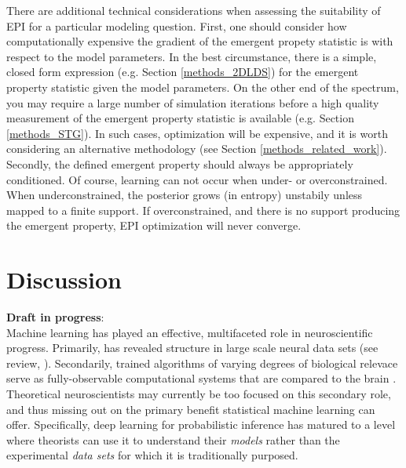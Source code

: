 \documentclass[11pt]{article}
\begin{document}
There are additional technical considerations when assessing the suitability of EPI for a particular modeling question.  
First, one should consider how computationally expensive the gradient of the emergent propety statistic is with respect to the model parameters. 
In the best circumstance, there is a simple, closed form expression (e.g. Section \ref{methods_2DLDS}) for the emergent property statistic given the model parameters.  
On the other end of the spectrum, you may require a large number of simulation iterations before a high quality measurement of the emergent property statistic is available  (e.g. Section \ref{methods_STG}).  In such cases, optimization will be expensive, and it is worth considering an alternative methodology (see Section \ref{methods_related_work}).   Secondly, the defined emergent property should always be appropriately conditioned.  
Of course, learning can not occur when under- or overconstrained.  
When underconstrained, the posterior grows (in entropy) unstabily unless mapped to a finite support.  
If overconstrained, and there is no support producing the emergent property, EPI optimization will never converge.

\section{Discussion}
\textbf{Draft in progress}: \\ 
Machine learning has played an effective, multifaceted role in neuroscientific progress. 
Primarily, has revealed structure in large scale neural data sets \cite{kass2001spike, brown1998statistical, paninski2004maximum, byron2009gaussian, latimer2015single, duncker2019learning} (see review, \cite{paninski2018neural}).  
Secondarily, trained algorithms of varying degrees of biological relevace serve as fully-observable computational systems that are compared to the brain \cite{ sussillo2013opening, richards2019deep}.  
Theoretical neuroscientists may currently be too focused on this secondary role, and thus missing out on the primary benefit statistical machine learning can offer.  
Specifically, deep learning for probabilistic inference has matured to a level where theorists can use it to understand their \textit{models} rather than the experimental \emph{data sets} for which it is traditionally purposed.
\end{document}
